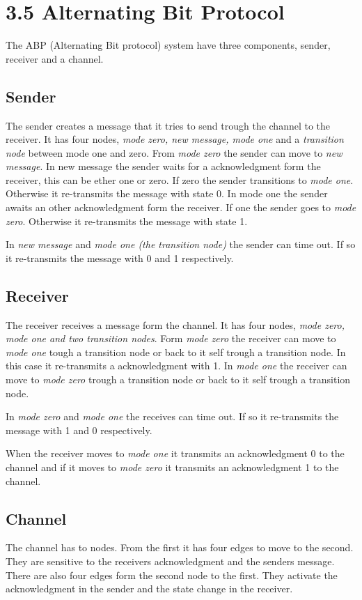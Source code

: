 \section{3.5 Alternating Bit Protocol}
\label{sec:orgbe25189}
The ABP (Alternating Bit protocol) system have three components, sender, receiver and a channel.

\subsection{Sender}
\label{sec:org7ae819b}
The sender creates a message that it tries to send trough the channel to the receiver. It has four nodes, \emph{mode zero, new message, mode one} and a \emph{transition node} between mode one and zero. From \emph{mode zero} the sender can move to \emph{new message}. In new message the sender waits for a acknowledgment form the receiver, this can be ether one or zero. If zero the sender transitions to \emph{mode one}. Otherwise it re-transmits the message with state 0. In mode one the sender awaits an other acknowledgment form the receiver. If one the sender goes to \emph{mode zero}. Otherwise it re-transmits the message with state 1.

In \emph{new message} and \emph{mode one (the transition node)} the sender can time out. If so it re-transmits the message with 0 and 1 respectively.

\subsection{Receiver}
\label{sec:orgd6300e9}
The receiver receives a message form the channel. It has four nodes, \emph{mode zero, mode one and two transition nodes}. Form \emph{mode zero} the receiver can move to \emph{mode one} tough a transition node or back to it self trough a transition node. In this case it re-transmits a acknowledgment with 1. In \emph{mode one} the receiver can move to \emph{mode zero} trough a transition node or back to it self trough a transition node.

In \emph{mode zero} and \emph{mode one} the receives can time out. If so it re-transmits the message with 1 and 0 respectively.

When the receiver moves to \emph{mode one} it transmits an acknowledgment 0 to the channel and if it moves to \emph{mode zero} it transmits an acknowledgment 1 to the channel.


\subsection{Channel}
\label{sec:org3ee9f26}
The channel has to nodes. From the first it has four edges to move to the second. They are sensitive to the receivers acknowledgment and the senders message. There are also four edges form the second node to the first. They activate the acknowledgment in the sender and the state change in the receiver.
